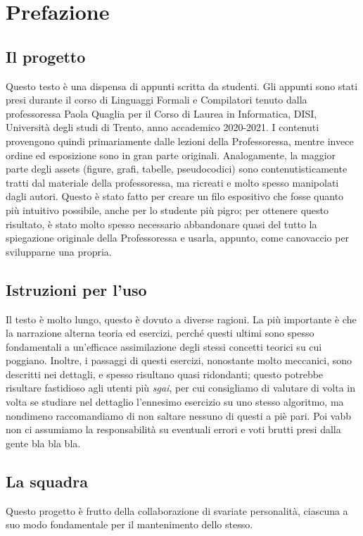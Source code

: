 \documentclass[class=book, crop=false, oneside, 12pt]{standalone}
\begin{document}
\chapter*{Prefazione}

\section*{Il progetto}
Questo testo è una dispensa di appunti scritta da studenti. Gli appunti sono stati presi durante il corso di Linguaggi Formali e Compilatori tenuto dalla professoressa Paola Quaglia per il Corso di Laurea in Informatica, DISI, Università degli studi di Trento, anno accademico 2020-2021. I contenuti provengono quindi primariamente dalle lezioni della Professoressa, mentre invece ordine ed esposizione sono in gran parte originali. Analogamente, la maggior parte degli assets (figure, grafi, tabelle, pseudocodici) sono contenutisticamente tratti dal materiale della professoressa, ma ricreati e molto spesso manipolati dagli autori. Questo è stato fatto per creare un filo espositivo che fosse quanto più intuitivo possibile, anche per lo studente più pigro; per ottenere questo risultato, è stato molto spesso necessario abbandonare quasi del tutto la spiegazione originale della Professoressa e usarla, appunto, come canovaccio per svilupparne una propria.

\section*{Istruzioni per l'uso}
Il testo è molto lungo, questo è dovuto a diverse ragioni. La più importante è che la narrazione alterna teoria ed esercizi, perché questi ultimi sono spesso fondamentali a un'efficace assimilazione degli stessi concetti teorici su cui poggiano. Inoltre, i passaggi di questi esercizi, nonostante molto meccanici, sono descritti nei dettagli, e spesso risultano quasi ridondanti; questo potrebbe risultare fastidioso agli utenti più \emph{sgai}, per cui consigliamo di valutare di volta in volta se studiare nel dettaglio l'ennesimo esercizio su uno stesso algoritmo, ma nondimeno raccomandiamo di non saltare nessuno di questi a piè pari. Poi vabb non ci assumiamo la responsabilità su eventuali errori e voti brutti presi dalla gente bla bla bla.

\section*{La squadra}
Questo progetto è frutto della collaborazione di svariate personalità, ciascuna a suo modo fondamentale per il mantenimento dello stesso.
\end{document}
